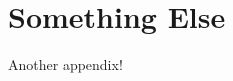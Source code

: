 \documentclass[../../main.tex]{subfiles}  %
\begin{document}
\section{Something Else}
Another appendix!
\end{document}
